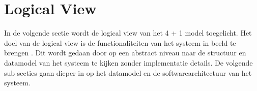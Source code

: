 \section{Logical View}
In de volgende sectie wordt de logical view van het 4 + 1 model toegelicht.
Het doel van de logical view is de functionaliteiten van het systeem in beeld te brengen \parencite{4p1Model}.
Dit wordt gedaan door op een abstract niveau naar de structuur en datamodel van het systeem te kijken zonder implementatie details.
De volgende sub secties gaan dieper in op het datamodel en de softwarearchitectuur van het systeem.


\newpage

